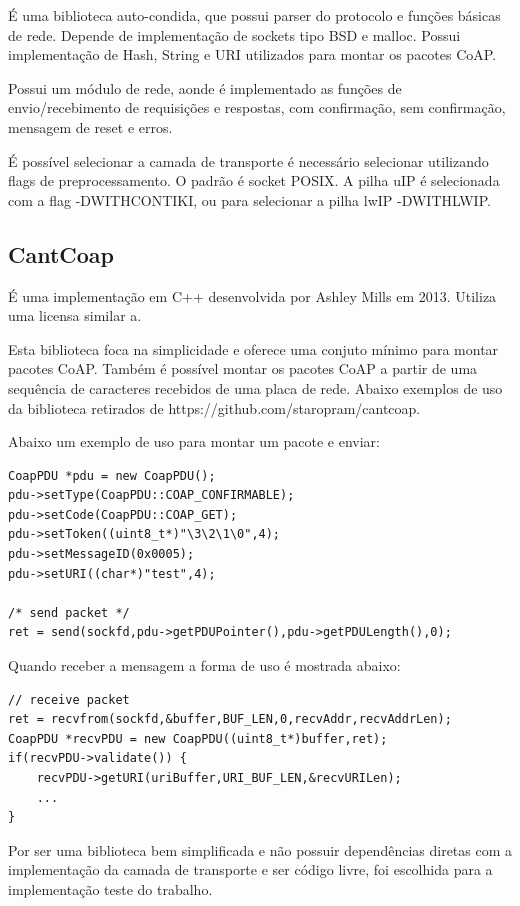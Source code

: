 \'E uma biblioteca auto-condida, que possui parser do protocolo e fun\c{c}\~oes b\'asicas de rede. Depende de implementa\c{c}\~ao de sockets tipo BSD e malloc. Possui implementa\c{c}\~ao de Hash, String e URI utilizados para montar os pacotes CoAP.

Possui um m\'odulo de rede, aonde \'e implementado as fun\c{c}\~oes de envio/recebimento de requisi\c{c}\~oes e respostas, com confirma\c{c}\~ao, sem confirma\c{c}\~ao, mensagem de reset e erros.

\'E poss\'ivel selecionar a camada de transporte \'e necess\'ario selecionar utilizando flags de preprocessamento. O padr\~ao \'e socket POSIX. A pilha uIP \'e selecionada com a flag -DWITH\textunderscore CONTIKI, ou para selecionar a pilha lwIP -DWITH\textunderscore LWIP.

\subsection{CantCoap}
\'E uma implementa\c{c}\~ao em C++ desenvolvida por Ashley Mills em 2013. Utiliza uma licensa similar a.

Esta biblioteca foca na simplicidade e oferece uma conjuto m\'inimo para montar pacotes CoAP.
Tamb\'em \'e poss\'ivel montar os pacotes CoAP a partir de uma sequ\^encia de caracteres recebidos de uma placa de rede. Abaixo exemplos de uso da biblioteca retirados de https://github.com/staropram/cantcoap.


\lstset{escapechar=@,style=customc}

Abaixo um exemplo de uso para montar um pacote e enviar:

\begin{lstlisting}
CoapPDU *pdu = new CoapPDU();
pdu->setType(CoapPDU::COAP_CONFIRMABLE);
pdu->setCode(CoapPDU::COAP_GET);
pdu->setToken((uint8_t*)"\3\2\1\0",4);
pdu->setMessageID(0x0005);
pdu->setURI((char*)"test",4);

/* send packet */
ret = send(sockfd,pdu->getPDUPointer(),pdu->getPDULength(),0);
\end{lstlisting}

Quando receber a mensagem a forma de uso \'e mostrada abaixo:
\begin{lstlisting}
// receive packet
ret = recvfrom(sockfd,&buffer,BUF_LEN,0,recvAddr,recvAddrLen);
CoapPDU *recvPDU = new CoapPDU((uint8_t*)buffer,ret);
if(recvPDU->validate()) {
    recvPDU->getURI(uriBuffer,URI_BUF_LEN,&recvURILen);
    ...
}
\end{lstlisting}

Por ser uma biblioteca bem simplificada e n\~ao possuir depend\^encias diretas com a implementa\c{c}\~ao da camada de transporte e ser c\'odigo livre, foi escolhida para a implementa\c{c}\~ao teste do trabalho.
